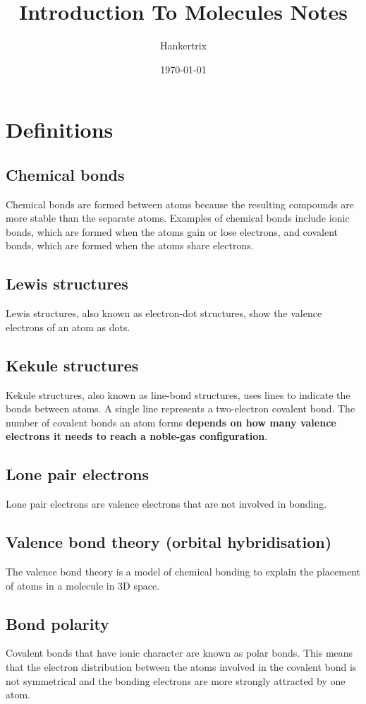 \documentclass[11pt]{article}
\author{Hankertrix}
\date{\today}
\title{Introduction To Molecules Notes}
\begin{document}
\maketitle
\setcounter{tocdepth}{2}
\tableofcontents \clearpage\section{Definitions}
\label{sec:orgbe197f7}

\subsection{Chemical bonds}
\label{sec:org77df3fe}
Chemical bonds are formed between atoms because the resulting compounds are more stable than the separate atoms. Examples of chemical bonds include ionic bonds, which are formed when the atoms gain or lose electrons, and covalent bonds, which are formed when the atoms share electrons.
\subsection{Lewis structures}
\label{sec:org48c6dae}
Lewis structures, also known as electron-dot structures, show the valence electrons of an atom as dots.
\subsection{Kekule structures}
\label{sec:org371b4cf}
Kekule structures, also known as line-bond structures, uses lines to indicate the bonds between atoms. A single line represents a two-electron covalent bond. The number of covalent bonds an atom forms \textbf{depends on how many valence electrons it needs to reach a noble-gas configuration}.
\subsection{Lone pair electrons}
\label{sec:org0c3c8b4}
Lone pair electrons are valence electrons that are not involved in bonding.
\subsection{Valence bond theory (orbital hybridisation)}
\label{sec:org6c8bc2a}
The valence bond theory is a model of chemical bonding to explain the placement of atoms in a molecule in 3D space.
\subsection{Bond polarity}
\label{sec:org8086dda}
Covalent bonds that have ionic character are known as polar bonds. This means that the electron distribution between the atoms involved in the covalent bond is not symmetrical and the bonding electrons are more strongly attracted by one atom.
\end{document}
